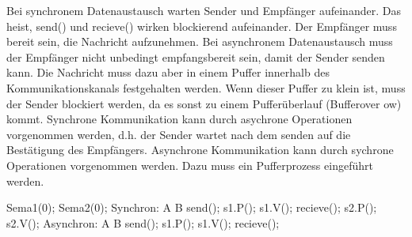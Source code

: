 \begin{answer}
Bei synchronem Datenaustausch warten Sender und Empfänger aufeinander. Das heist, send()
und recieve() wirken blockierend aufeinander. Der Empfänger muss bereit sein, die Nachricht aufzunehmen.
Bei asynchronem Datenaustausch muss der Empfänger nicht unbedingt empfangsbereit sein, damit
der Sender senden kann. Die Nachricht muss dazu aber in einem Puffer innerhalb des Kommunikationskanals
festgehalten werden. Wenn dieser Puffer zu klein ist, muss der Sender blockiert
werden, da es sonst zu einem Pufferüberlauf (Bufferover
ow) kommt.
Synchrone Kommunikation kann durch asychrone Operationen vorgenommen werden, d.h. der
Sender wartet nach dem senden auf die Bestätigung des Empfängers.
Asynchrone Kommunikation kann durch sychrone Operationen vorgenommen werden. Dazu muss
ein Pufferprozess eingeführt werden.
\end{answer}

\begin{answer}
Sema1(0);
Sema2(0);
Synchron:
A B
send(); s1.P();
s1.V(); recieve();
s2.P(); s2.V();
Asynchron:
A B
send(); s1.P();
s1.V(); recieve();
\end{answer}
